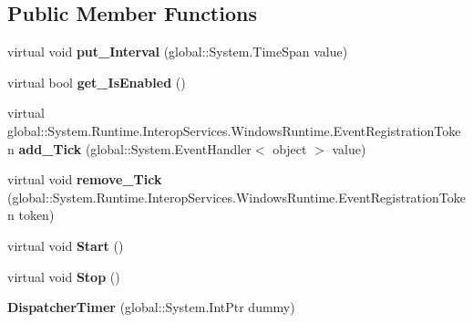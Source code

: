 \subsection*{Public Member Functions}
\begin{DoxyCompactItemize}
\item 
\mbox{\label{class_windows_1_1_u_i_1_1_xaml_1_1_dispatcher_timer_a87fbb85d7540c9ede1de8c5586bab52b}} 
virtual void {\bfseries put\+\_\+\+Interval} (global\+::\+System.\+Time\+Span value)
\item 
\mbox{\label{class_windows_1_1_u_i_1_1_xaml_1_1_dispatcher_timer_aa01da6df2d38218542106e2b5024d1ad}} 
virtual bool {\bfseries get\+\_\+\+Is\+Enabled} ()
\item 
\mbox{\label{class_windows_1_1_u_i_1_1_xaml_1_1_dispatcher_timer_afec18a9d2af7458ea713ce3d73bf8fc8}} 
virtual global\+::\+System.\+Runtime.\+Interop\+Services.\+Windows\+Runtime.\+Event\+Registration\+Token {\bfseries add\+\_\+\+Tick} (global\+::\+System.\+Event\+Handler$<$ object $>$ value)
\item 
\mbox{\label{class_windows_1_1_u_i_1_1_xaml_1_1_dispatcher_timer_a2dead21112a95b1c2d77308cd76f9917}} 
virtual void {\bfseries remove\+\_\+\+Tick} (global\+::\+System.\+Runtime.\+Interop\+Services.\+Windows\+Runtime.\+Event\+Registration\+Token token)
\item 
\mbox{\label{class_windows_1_1_u_i_1_1_xaml_1_1_dispatcher_timer_ace863a2c747bd7aa446b55fd38eaca7e}} 
virtual void {\bfseries Start} ()
\item 
\mbox{\label{class_windows_1_1_u_i_1_1_xaml_1_1_dispatcher_timer_a8465a583b290d1ba135b41f118bb7e91}} 
virtual void {\bfseries Stop} ()
\item 
\mbox{\label{class_windows_1_1_u_i_1_1_xaml_1_1_dispatcher_timer_a46c10638999c5f9db1a7102ce752b5e1}} 
{\bfseries Dispatcher\+Timer} (global\+::\+System.\+Int\+Ptr dummy)

\end{DoxyCompactItemize}
